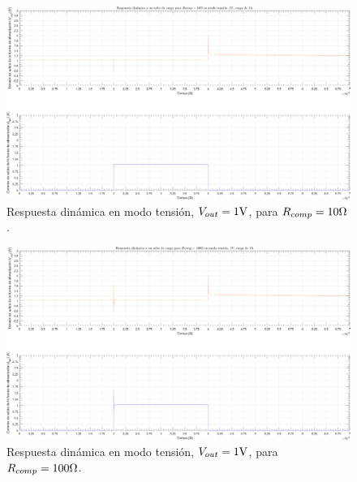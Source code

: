 \clearpage

\begin{figure}[H] %
\begin{center}
\includegraphics[width=1.1 \textwidth, angle=90]{./img/plots/dynamic/power_supply_RCOMP_10_STEP_Modo2.png}
\caption{\label{fig:fig_power_supply_RCOMP_STEP_10_Modo2}\footnotesize{Respuesta dinámica en modo tensión, $V_{out} = 1 \si[per-mode=symbol]{\volt}$, para $R_{comp} = 10 \si[per-mode=symbol]{\ohm} $.}}
\end{center}
\end{figure}

\clearpage

\begin{figure}[H] %
\begin{center}
\includegraphics[width=1.1 \textwidth, angle=90]{./img/plots/dynamic/power_supply_RCOMP_100_STEP_Modo2.png}
\caption{\label{fig:fig_power_supply_RCOMP_STEP_100_Modo2}\footnotesize{Respuesta dinámica en modo tensión, $V_{out} = 1 \si[per-mode=symbol]{\volt}$, para $R_{comp} = 100 \si[per-mode=symbol]{\ohm} $.}}
\end{center}
\end{figure}

